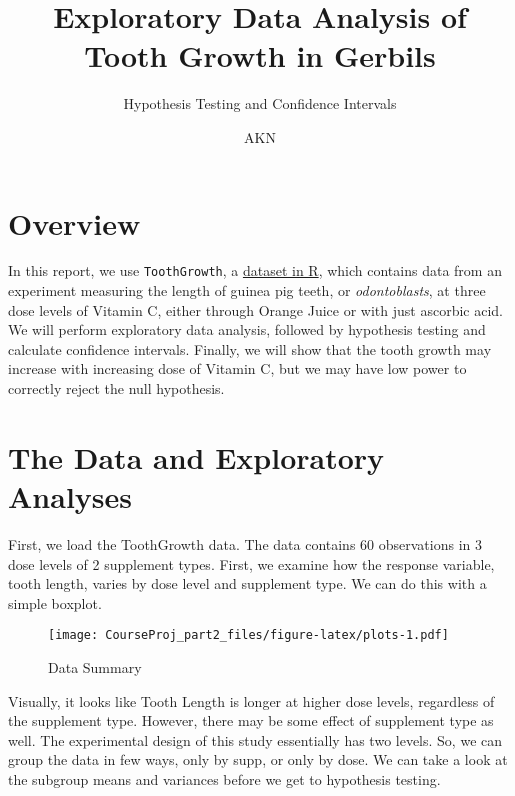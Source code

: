 \documentclass[]{article}
\title{Exploratory Data Analysis of Tooth Growth in Gerbils}
\subtitle{Hypothesis Testing and Confidence Intervals}
\author{AKN}
\date{}
\newenvironment{Shaded}{\begin{snugshade}}{\end{snugshade}}
\newcommand{\KeywordTok}[1]{\textcolor[rgb]{0.13,0.29,0.53}{\textbf{{#1}}}}
\newcommand{\StringTok}[1]{\textcolor[rgb]{0.31,0.60,0.02}{{#1}}}
\newcommand{\NormalTok}[1]{{#1}}
\begin{document}
\maketitle


\section{Overview}\label{overview}

In this report, we use \texttt{ToothGrowth}, a
\href{https://stat.ethz.ch/R-manual/R-devel/library/datasets/html/ToothGrowth.html}{dataset
in R}, which contains data from an experiment measuring the length of
guinea pig teeth, or \emph{odontoblasts}, at three dose levels of
Vitamin C, either through Orange Juice or with just ascorbic acid. We
will perform exploratory data analysis, followed by hypothesis testing
and calculate confidence intervals. Finally, we will show that the tooth
growth may increase with increasing dose of Vitamin C, but we may have
low power to correctly reject the null hypothesis.

\section{The Data and Exploratory
Analyses}\label{the-data-and-exploratory-analyses}

First, we load the ToothGrowth data. The data contains 60 observations
in 3 dose levels of 2 supplement types. First, we examine how the
response variable, tooth length, varies by dose level and supplement
type. We can do this with a simple boxplot.

\begin{Shaded}
\end{Shaded}

\begin{figure}[htbp]
\centering
\texttt{[image: CourseProj\_part2\_files/figure-latex/plots-1.pdf]}
\caption{Data Summary}
\end{figure}

Visually, it looks like Tooth Length is longer at higher dose levels,
regardless of the supplement type. However, there may be some effect of
supplement type as well. The experimental design of this study
essentially has two levels. So, we can group the data in few ways, only
by supp, or only by dose. We can take a look at the subgroup means and
variances before we get to hypothesis testing.
\end{document}
